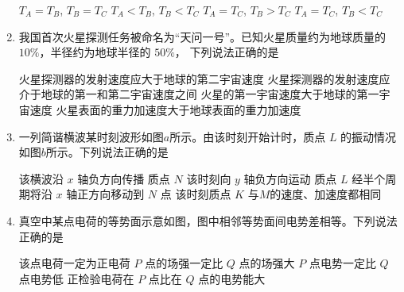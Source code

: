 \begin{enumerate}
\begin{figure}[h!]
\end{figure}


\fourchoices
{$T_{A}=T_{B} $, $ T_{B}=T_{C}$}
{$ T_{A}<T_{B} $, $ T_{B}<T_{C}$}
{$ T_{A}=T_{C} $, $ T_{B}>T_{C}$}
{$ T_{A}=T_{C} $, $ T_{B}<T_{C}$}


\item
我国首次火星探测任务被命名为“天问一号”。已知火星质量约为地球质量的 $ 10 \% $，半径约为地球半径的 $ 50 \% $，
下列说法正确的是  

\fourchoices
{火星探测器的发射速度应大于地球的第二宇宙速度}
{火星探测器的发射速度应介于地球的第一和第二宇宙速度之间}
{火星的第一宇宙速度大于地球的第一宇宙速度}
{火星表面的重力加速度大于地球表面的重力加速度}


\item
一列简谐横波某时刻波形如图$ a $所示。由该时刻开始计时，质点 $ L $ 的振动情况如图$ b $所示。下列说法正确的是  
\begin{figure}[h!]
\centering
\begin{subfigure}{0.4\linewidth}
\centering
 
\caption{}\label{}
\end{subfigure}
\begin{subfigure}{0.4\linewidth}
\centering
 
\caption{}\label{}
\end{subfigure}
\end{figure}


\fourchoices
{该横波沿 $ x $ 轴负方向传播}
{质点 $ N $ 该时刻向 $ y $ 轴负方向运动}
{质点 $ L $ 经半个周期将沿 $ x $ 轴正方向移动到 $ N $ 点}
{该时刻质点 $ K $ 与$ M $的速度、加速度都相同}

\item
真空中某点电荷的等势面示意如图，图中相邻等势面间电势差相等。下列说法正确的是  
\begin{figure}[h!]
\centering

\end{figure}


\fourchoices
{该点电荷一定为正电荷}
{$ P $ 点的场强一定比 $ Q $ 点的场强大}
{$ P $ 点电势一定比 $ Q $ 点电势低}
{正检验电荷在 $ P $ 点比在 $ Q $ 点的电势能大}


\end{enumerate}
